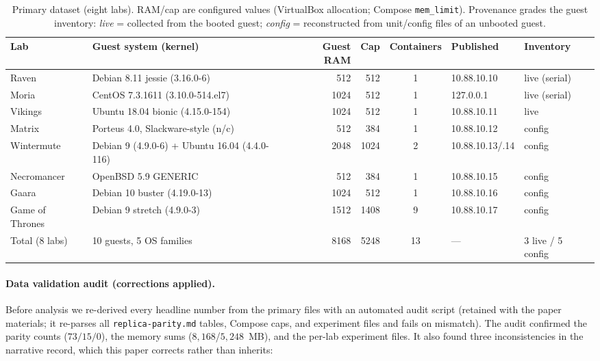 \documentclass[3p,twocolumn,authoryear]{elsarticle}
\begin{document}
\begin{table}[tbp]
\caption{Primary dataset (eight labs). RAM/cap are configured values
(VirtualBox allocation; Compose \texttt{mem\_limit}). Provenance grades
the guest inventory: \emph{live} = collected from the booted guest;
\emph{config} = reconstructed from unit/config files of an unbooted
guest.}
\label{tab:dataset}
\centering\footnotesize
\begin{tabularx}{\textwidth}{lXrrcll}
\toprule
Lab & Guest system (kernel) & Guest RAM & Cap & Containers & Published & Inventory\\
\midrule
Raven & Debian 8.11 jessie (3.16.0-6) & 512 & 512 & 1 & 10.88.10.10 & live (serial)\\
Moria & CentOS 7.3.1611 (3.10.0-514.el7) & 1024 & 512 & 1 & 127.0.0.1 & live (serial)\\
Vikings & Ubuntu 18.04 bionic (4.15.0-154) & 1024 & 512 & 1 & 10.88.10.11 & live\\
Matrix & Porteus 4.0, Slackware-style (n/c) & 512 & 384 & 1 & 10.88.10.12 & config\\
Wintermute & Debian 9 (4.9.0-6) + Ubuntu 16.04 (4.4.0-116) & 2048 & 1024 & 2 & 10.88.10.13/.14 & config\\
Necromancer & OpenBSD 5.9 GENERIC & 512 & 384 & 1 & 10.88.10.15 & config\\
Gaara & Debian 10 buster (4.19.0-13) & 1024 & 512 & 1 & 10.88.10.16 & config\\
Game of Thrones & Debian 9 stretch (4.9.0-3) & 1512 & 1408 & 9 & 10.88.10.17 & config\\
\midrule
Total (8 labs) & 10 guests, 5 OS families & 8168 & 5248 & 13 & --- & 3 live / 5 config\\
\bottomrule
\end{tabularx}
\end{table}

\paragraph{Data validation audit (corrections applied).}
Before analysis we re-derived every headline number from the primary
files with an automated audit script (retained with the paper
materials; it re-parses all \texttt{replica-parity.md} tables,
Compose caps, and experiment files and fails on mismatch). The audit
confirmed the parity counts ($73/15/0$), the memory sums
($8{,}168$/$5{,}248$~MB), and the per-lab experiment files. It also
found three inconsistencies in the narrative record, which this paper
corrects rather than inherits:
\end{document}
